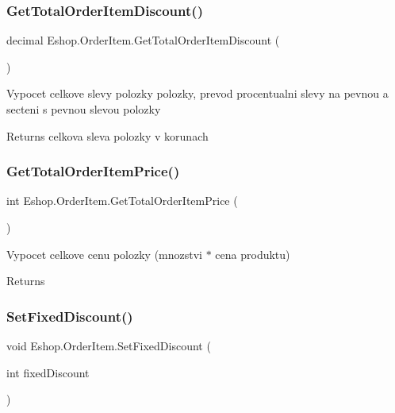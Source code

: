 \subsubsection{\texorpdfstring{GetTotalOrderItemDiscount()}{GetTotalOrderItemDiscount()}}
{\footnotesize\ttfamily decimal Eshop.\+Order\+Item.\+Get\+Total\+Order\+Item\+Discount (\begin{DoxyParamCaption}{ }\end{DoxyParamCaption})}



Vypocet celkove slevy polozky polozky, prevod procentualni slevy na pevnou a secteni s pevnou slevou polozky 

\begin{DoxyReturn}{Returns}
celkova sleva polozky v korunach
\end{DoxyReturn}
\mbox{\label{class_eshop_1_1_order_item_a68867e76d65c7d59f440ac1f15bf755b}} 
\subsubsection{\texorpdfstring{GetTotalOrderItemPrice()}{GetTotalOrderItemPrice()}}
{\footnotesize\ttfamily int Eshop.\+Order\+Item.\+Get\+Total\+Order\+Item\+Price (\begin{DoxyParamCaption}{ }\end{DoxyParamCaption})}



Vypocet celkove cenu polozky (mnozstvi $\ast$ cena produktu) 

\begin{DoxyReturn}{Returns}

\end{DoxyReturn}
\mbox{\label{class_eshop_1_1_order_item_a7d3dbf9b8a436fbd1977a724c6ea8b83}} 
\subsubsection{\texorpdfstring{SetFixedDiscount()}{SetFixedDiscount()}}
{\footnotesize\ttfamily void Eshop.\+Order\+Item.\+Set\+Fixed\+Discount (\begin{DoxyParamCaption}\item[{int}]{fixed\+Discount }\end{DoxyParamCaption})}



